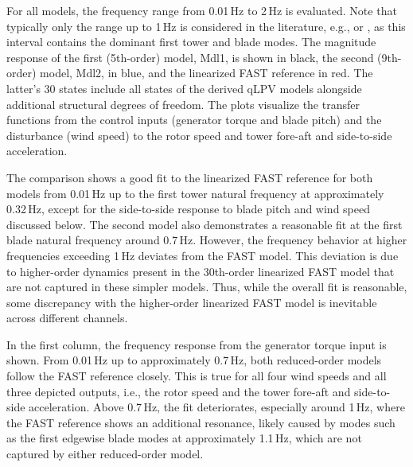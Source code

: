     For all models, the frequency range from 0.01\,Hz to 2\,Hz is evaluated. Note that typically only the range up to 1\,Hz is considered in the literature, e.g., \cite{schlipf2013nonlinear} or \cite{pamososuryo2022individual}, as this interval contains the dominant first tower and blade modes. The magnitude response of the first (5th-order) model, Mdl1, is shown in black, the second (9th-order) model, Mdl2, in blue, and the linearized FAST reference in red. The latter's 30 states include all states of the derived qLPV models alongside additional structural degrees of freedom. The plots visualize the transfer functions from the control inputs (generator torque and blade pitch) and the disturbance (wind speed) to the rotor speed and tower fore-aft and side-to-side acceleration.
    
    The comparison shows a good fit to the linearized FAST reference for both models from 0.01\,Hz up to the first tower natural frequency at approximately 0.32\,Hz, except for the side-to-side response to blade pitch and wind speed discussed below. The second model also demonstrates a reasonable fit at the first blade natural frequency around 0.7\,Hz. However, the frequency behavior at higher frequencies exceeding 1\,Hz deviates from the FAST model. This deviation is due to higher-order dynamics present in the 30th-order linearized FAST model that are not captured in these simpler models. Thus, while the overall fit is reasonable, some discrepancy with the higher-order linearized FAST model is inevitable across different channels.
    
    In the first column, the frequency response from the generator torque input is shown. From 0.01\,Hz up to approximately 0.7\,Hz, both reduced-order models follow the FAST reference closely. This is true for all four wind speeds and all three depicted outputs, i.e., the rotor speed and the tower fore-aft and side-to-side acceleration. Above 0.7\,Hz, the fit deteriorates, especially around 1\,Hz, where the FAST reference shows an additional resonance, likely caused by modes such as the first edgewise blade modes at approximately 1.1\,Hz, which are not captured by either reduced-order model.
    
